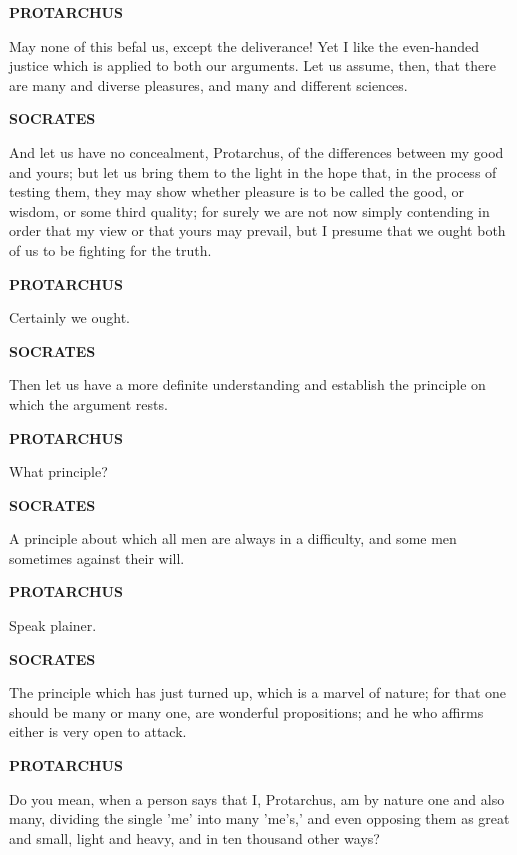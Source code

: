 \documentclass[11pt,letter]{article}
\begin{document}
\par \textbf{PROTARCHUS}
\par   May none of this befal us, except the deliverance! Yet I like the even-handed justice which is applied to both our arguments. Let us assume, then, that there are many and diverse pleasures, and many and different sciences.

\par \textbf{SOCRATES}
\par   And let us have no concealment, Protarchus, of the differences between my good and yours; but let us bring them to the light in the hope that, in the process of testing them, they may show whether pleasure is to be called the good, or wisdom, or some third quality; for surely we are not now simply contending in order that my view or that yours may prevail, but I presume that we ought both of us to be fighting for the truth.

\par \textbf{PROTARCHUS}
\par   Certainly we ought.

\par \textbf{SOCRATES}
\par   Then let us have a more definite understanding and establish the principle on which the argument rests.

\par \textbf{PROTARCHUS}
\par   What principle?

\par \textbf{SOCRATES}
\par   A principle about which all men are always in a difficulty, and some men sometimes against their will.

\par \textbf{PROTARCHUS}
\par   Speak plainer.

\par \textbf{SOCRATES}
\par   The principle which has just turned up, which is a marvel of nature; for that one should be many or many one, are wonderful propositions; and he who affirms either is very open to attack.

\par \textbf{PROTARCHUS}
\par   Do you mean, when a person says that I, Protarchus, am by nature one and also many, dividing the single 'me' into many 'me's,' and even opposing them as great and small, light and heavy, and in ten thousand other ways?
\end{document}
